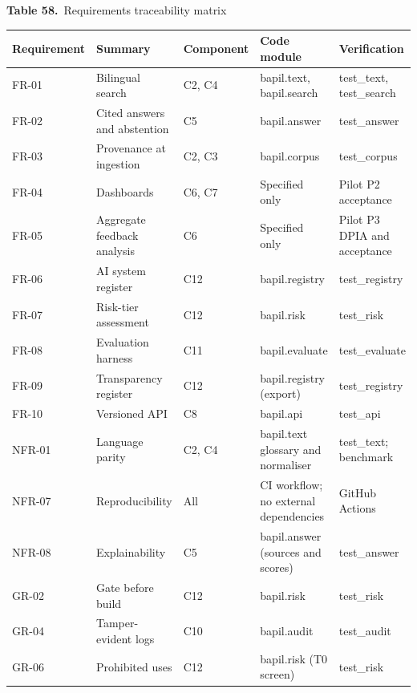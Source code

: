 \documentclass[border=10pt]{standalone}
\begin{document}
\begin{minipage}{17cm}
{\large\bfseries Table 58.}\ {\large Requirements traceability matrix}\par\vspace{7pt}
\small
{}
\begin{tabularx}{\linewidth}{@{}>{\hsize=0.588\hsize\raggedright\arraybackslash}X>{\hsize=1.765\hsize\raggedright\arraybackslash}X>{\hsize=0.588\hsize\raggedright\arraybackslash}X>{\hsize=1.118\hsize\raggedright\arraybackslash}X>{\hsize=0.941\hsize\raggedright\arraybackslash}X@{}}
\arrayrulecolor{bapilrule}\toprule
\rowcolor{white}\textbf{Requirement} & \textbf{Summary} & \textbf{Component} & \textbf{Code module} & \textbf{Verification} \\
\midrule
FR-01 & Bilingual search & C2, C4 & bapil.text, bapil.search & test\_text, test\_search \\
FR-02 & Cited answers and abstention & C5 & bapil.answer & test\_answer \\
FR-03 & Provenance at ingestion & C2, C3 & bapil.corpus & test\_corpus \\
FR-04 & Dashboards & C6, C7 & Specified only & Pilot P2 acceptance \\
FR-05 & Aggregate feedback analysis & C6 & Specified only & Pilot P3 DPIA and acceptance \\
FR-06 & AI system register & C12 & bapil.registry & test\_registry \\
FR-07 & Risk-tier assessment & C12 & bapil.risk & test\_risk \\
FR-08 & Evaluation harness & C11 & bapil.evaluate & test\_evaluate \\
FR-09 & Transparency register & C12 & bapil.registry (export) & test\_registry \\
FR-10 & Versioned API & C8 & bapil.api & test\_api \\
NFR-01 & Language parity & C2, C4 & bapil.text glossary and normaliser & test\_text; benchmark \\
NFR-07 & Reproducibility & All & CI workflow; no external dependencies & GitHub Actions \\
NFR-08 & Explainability & C5 & bapil.answer (sources and scores) & test\_answer \\
GR-02 & Gate before build & C12 & bapil.risk & test\_risk \\
GR-04 & Tamper-evident logs & C10 & bapil.audit & test\_audit \\
GR-06 & Prohibited uses & C12 & bapil.risk (T0 screen) & test\_risk \\
\bottomrule
\end{tabularx}
\par{}
\end{minipage}
\end{document}
